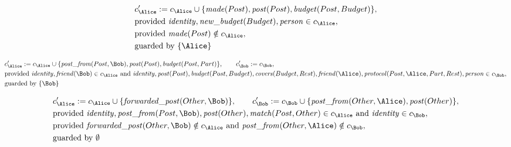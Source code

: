\begin{align*}
&
c'_
{
\Alice
}
 := 
c_
{
\Alice
}
 \cup 
\{
\mathit{\detokenize{
made
}}
(
Post
)
,
\mathit{\detokenize{
post
}}
(
Post
)
,
\mathit{\detokenize{
budget
}}
(
Post
,
Budget
)
\}
,\\
&
\text{provided } 
\mathit{\detokenize{
identity
}}
,
\mathit{\detokenize{
new_budget
}}
(
Budget
)
,
\mathit{\detokenize{
person
}}
 \in c_
{
\Alice
}
,\\
&
\text{provided } 
\mathit{\detokenize{
made
}}
(
Post
)
 \notin c_
{
\Alice
}
,\\
&
\text{guarded by } \{
\Alice
\}
\end{align*}

\begin{align*}
&
c'_
{
\Alice
}
 := 
c_
{
\Alice
}
 \cup 
\{
\mathit{\detokenize{
post_from
}}
(
Post
,
\Bob
)
,
\mathit{\detokenize{
post
}}
(
Post
)
,
\mathit{\detokenize{
budget
}}
(
Post
,
Part
)
\}
, \qquad 
c'_
{
\Bob
}
 := 
c_
{
\Bob
}
,\\
&
\text{provided } 
\mathit{\detokenize{
identity
}}
,
\mathit{\detokenize{
friend
}}
(
\Bob
)
 \in c_
{
\Alice
}
 \text{ and } 
\mathit{\detokenize{
identity
}}
,
\mathit{\detokenize{
post
}}
(
Post
)
,
\mathit{\detokenize{
budget
}}
(
Post
,
Budget
)
,
\mathit{\detokenize{
covers
}}
(
Budget
,
Rest
)
,
\mathit{\detokenize{
friend
}}
(
\Alice
)
,
\mathit{\detokenize{
protocol
}}
(
Post
,
\Alice
,
Part
,
Rest
)
,
\mathit{\detokenize{
person
}}
 \in c_
{
\Bob
}
,\\
&
\text{guarded by } \{
\Bob
\}
\end{align*}

\begin{align*}
&
c'_
{
\Alice
}
 := 
c_
{
\Alice
}
 \cup 
\{
\mathit{\detokenize{
forwarded_post
}}
(
Other
,
\Bob
)
\}
, \qquad 
c'_
{
\Bob
}
 := 
c_
{
\Bob
}
 \cup 
\{
\mathit{\detokenize{
post_from
}}
(
Other
,
\Alice
)
,
\mathit{\detokenize{
post
}}
(
Other
)
\}
,\\
&
\text{provided } 
\mathit{\detokenize{
identity
}}
,
\mathit{\detokenize{
post_from
}}
(
Post
,
\Bob
)
,
\mathit{\detokenize{
post
}}
(
Other
)
,
\mathit{\detokenize{
match
}}
(
Post
,
Other
)
 \in c_
{
\Alice
}
 \text{ and } 
\mathit{\detokenize{
identity
}}
 \in c_
{
\Bob
}
,\\
&
\text{provided } 
\mathit{\detokenize{
forwarded_post
}}
(
Other
,
\Bob
)
 \notin c_
{
\Alice
}
 \text{ and } 
\mathit{\detokenize{
post_from
}}
(
Other
,
\Alice
)
 \notin c_
{
\Bob
}
,\\
&
\text{guarded by } \emptyset
\end{align*}
